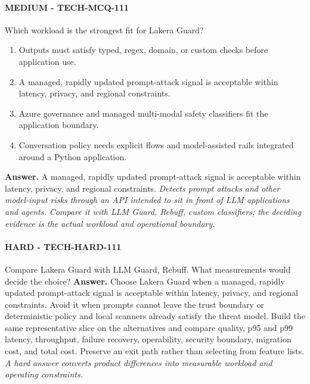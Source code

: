\paragraph{MEDIUM - TECH-MCQ-111} Which workload is the strongest fit for Lakera Guard?
\begin{enumerate}[label=\Alph*.]
\item Outputs must satisfy typed, regex, domain, or custom checks before application use.
\item A managed, rapidly updated prompt-attack signal is acceptable within latency, privacy, and regional constraints.
\item Azure governance and managed multi-modal safety classifiers fit the application boundary.
\item Conversation policy needs explicit flows and model-assisted rails integrated around a Python application.
\end{enumerate}
\textbf{Answer.} A managed, rapidly updated prompt-attack signal is acceptable within latency, privacy, and regional constraints.
\textit{Detects prompt attacks and other model-input risks through an API intended to sit in front of LLM applications and agents. Compare it with LLM Guard, Rebuff, custom classifiers; the deciding evidence is the actual workload and operational boundary.}
\paragraph{HARD - TECH-HARD-111} Compare Lakera Guard with LLM Guard, Rebuff. What measurements would decide the choice?
\textbf{Answer.} Choose Lakera Guard when a managed, rapidly updated prompt-attack signal is acceptable within latency, privacy, and regional constraints. Avoid it when prompts cannot leave the trust boundary or deterministic policy and local scanners already satisfy the threat model. Build the same representative slice on the alternatives and compare quality, p95 and p99 latency, throughput, failure recovery, operability, security boundary, migration cost, and total cost. Preserve an exit path rather than selecting from feature lists.
\textit{A hard answer converts product differences into measurable workload and operating constraints.}
